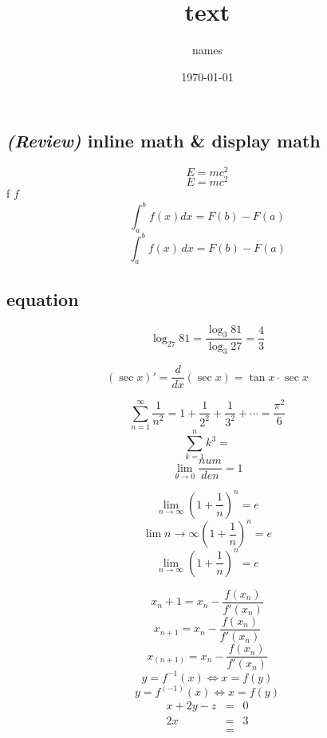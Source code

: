 \documentclass{article}
\title{text}
\author{names}
\date{\today}
\begin{document}
\maketitle
\tableofcontents
\subsection{\textit{(Review)} inline math \& display math}
\[ E=mc^2\]
$$ E=mc^2 $$
f  $f$
\[ \int _a^b f(x)dx=F(b)-F(a) \]
\[   \int _{a}^{b} f(x)\,dx =F(b)-F(a)\]
\subsection{equation}
\begin{equation}
	\log_{27} 81=\frac{\log_3 81}{\log_3 27}=\frac{4}{3}
\end{equation}

\begin{equation}
	(\sec x)'= \frac{d}{dx}(\sec x)=\tan x\cdot \sec x
\end{equation}

\begin{equation}
	\sum_{n=1}^{\infty}
	\frac{1}{n^2}=1+\frac{1}{2^2}+\frac{1}{3^2}+\cdots
	=\frac{\pi^2}{6}
\end{equation}
\begin{equation*}
	\sum_{k=1}^{n}k^3
	=
\end{equation*}
\begin{equation}
	\lim_{\theta \to 0}\frac{num}{den}=1
\end{equation}

\begin{equation}
	\lim_{n \to \infty}\left (1+\frac{1}{n}\right)^n
	=e  
\end{equation}
\begin{equation}
	\lim{n \to \infty}\left (1+\frac{1}{n}\right)^n
	=e  
\end{equation}
\begin{equation}
	\lim_{n \to \infty} (1+\frac{1}{n})^n
	=e  
\end{equation}

\begin{equation}
	 x_n+1=x_n - \frac{f(x_n)}{f'(x_n)}
\end{equation}
\begin{equation}
	x_{n+1}=x_n - \frac{f(x_n)}{f'(x_n)}
\end{equation}
\begin{equation}
	x_(n+1)=x_n - \frac{f(x_n)}{f'(x_n)}
\end{equation}
\begin{equation}
	y = f^{-1}(x)\Leftrightarrow x=f(y)
\end{equation}
\begin{equation}
	y = f^(-1)(x)\Leftrightarrow x=f(y)
\end{equation}
\begin{eqnarray}
	x+2y-z&=&0\\
	2x&=&3\\
	&=&\\
\end{eqnarray}
\end{document}
